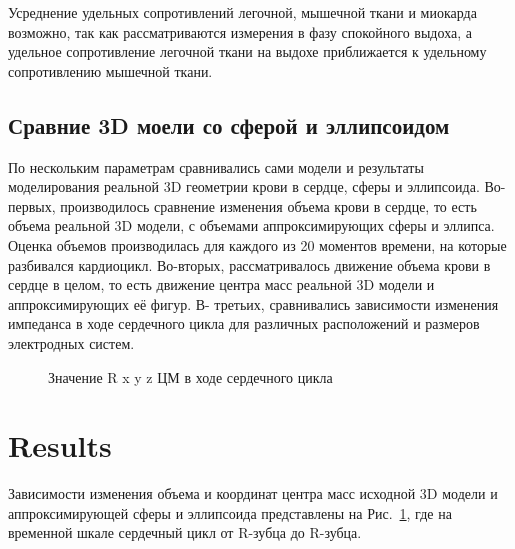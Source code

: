 \documentclass[conference]{IEEEtran}
\begin{document}
Усреднение удельных сопротивлений легочной, мышечной ткани и миокарда возможно, так как рассматриваются измерения в фазу спокойного выдоха, а удельное сопротивление легочной ткани на выдохе приближается к удельному сопротивлению мышечной ткани.

\subsection{Сравние 3D моели со сферой и эллипсоидом}

По нескольким параметрам сравнивались сами модели и результаты моделирования реальной 3D геометрии крови в сердце, сферы и эллипсоида.
Во-первых, производилось сравнение изменения объема крови в сердце, то есть объема реальной 3D модели, с объемами аппроксимирующих сферы и эллипса. Оценка объемов производилась для каждого из 20 моментов времени, на которые разбивался кардиоцикл.
Во-вторых, рассматривалось движение объема крови в сердце в целом, то есть движение центра масс реальной 3D модели и аппроксимирующих её фигур.
В- третьих, сравнивались зависимости изменения импеданса в ходе сердечного цикла для различных расположений и размеров электродных систем.

\begin{figure}[htbp]
    \caption{Значение R x y z ЦМ в ходе сердечного цикла}
    \label{fig:rxyz}
\end{figure}

\section{Results}

Зависимости изменения объема и координат центра масс исходной 3D модели и аппроксимирующей сферы и эллипсоида представлены на Рис.~\ref{fig:rxyz},
где на временной шкале сердечный цикл от R-зубца до R-зубца.
\end{document}
